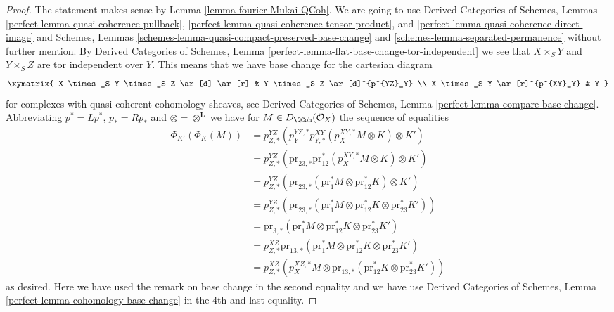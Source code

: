 \begin{proof}
The statement makes sense by Lemma \ref{lemma-fourier-Mukai-QCoh}.
We are going to use
Derived Categories of Schemes, Lemmas
\ref{perfect-lemma-quasi-coherence-pullback},
\ref{perfect-lemma-quasi-coherence-tensor-product}, and
\ref{perfect-lemma-quasi-coherence-direct-image}
and Schemes, Lemmas
\ref{schemes-lemma-quasi-compact-preserved-base-change} and
\ref{schemes-lemma-separated-permanence}
without further mention.
By Derived Categories of Schemes, Lemma
\ref{perfect-lemma-flat-base-change-tor-independent}
we see that $X \times_S Y$ and $Y \times_S Z$ are tor independent
over $Y$. This means that we have base change for the cartesian diagram
$$
\xymatrix{
X \times_S Y \times_S Z \ar[d] \ar[r] &
Y \times_S Z \ar[d]^{p^{YZ}_Y} \\
X \times_S Y \ar[r]^{p^{XY}_Y} & Y
}
$$
for complexes with quasi-coherent cohomology sheaves, see
Derived Categories of Schemes, Lemma \ref{perfect-lemma-compare-base-change}.
Abbreviating $p^* = Lp^*$, $p_* = Rp_*$ and $\otimes = \otimes^\mathbf{L}$
we have for $M \in D_\QCoh(\mathcal{O}_X)$ the sequence of equalities
\begin{align*}
\Phi_{K'}(\Phi_K(M))
& =
p^{YZ}_{Z, *}(p^{YZ, *}_Y p^{XY}_{Y, *}(p^{XY, *}_X M \otimes K) \otimes K') \\
& =
p^{YZ}_{Z, *}(\text{pr}_{23, *} \text{pr}_{12}^*(p^{XY, *}_X M \otimes K)
\otimes K') \\
& =
p^{YZ}_{Z, *}(\text{pr}_{23, *}(\text{pr}_1^*M \otimes \text{pr}_{12}^*K)
\otimes K') \\
& =
p^{YZ}_{Z, *}(\text{pr}_{23, *}(\text{pr}_1^*M \otimes \text{pr}_{12}^*K
\otimes \text{pr}_{23}^*K')) \\
& =
\text{pr}_{3, *}(\text{pr}_1^*M \otimes \text{pr}_{12}^*K
\otimes \text{pr}_{23}^*K') \\
& =
p^{XZ}_{Z, *}\text{pr}_{13, *}(\text{pr}_1^*M \otimes \text{pr}_{12}^*K
\otimes \text{pr}_{23}^*K') \\
& =
p^{XZ}_{Z, *} (p^{XZ, *}_X M \otimes \text{pr}_{13, *}(\text{pr}_{12}^*K
\otimes \text{pr}_{23}^*K'))
\end{align*}
as desired. Here we have used the remark on base change in the
second equality and we have use Derived Categories of Schemes, Lemma
\ref{perfect-lemma-cohomology-base-change} in the $4$th and
last equality.
\end{proof}

